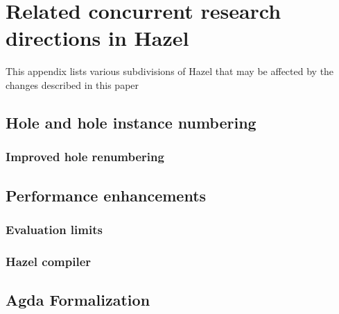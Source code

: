 \chapter{Related concurrent research directions in Hazel}
\label{app:contributions}

This appendix lists various subdivisions of Hazel that may be affected by the changes described in this paper

\section{Hole and hole instance numbering}
\label{sec:concurrent_work_numbering}

\subsection{Improved hole renumbering}
\label{sec:other_hole_numbering}


\section{Performance enhancements}
\label{sec:concurrent_work_performance}

\subsection{Evaluation limits}
\label{sec:gas}


\subsection{Hazel compiler}
\label{sec:concurrent_work_compiler}


\section{Agda Formalization}
\label{sec:concurrent_work_formalization}


